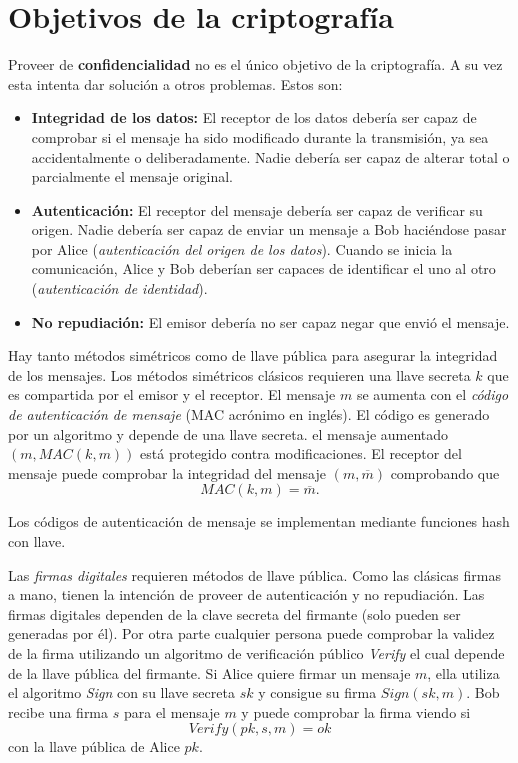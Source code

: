 \documentclass[12pt]{book}
\theoremstyle{definition}
\begin{document}
\section{Objetivos de la criptografía}

Proveer de \textbf{confidencialidad} no es el único objetivo de la criptografía. A su vez esta intenta dar solución a otros problemas. Estos son:

\begin{itemize}
\item \textbf{Integridad de los datos:} El receptor de los datos debería ser capaz de comprobar si el mensaje ha sido modificado durante la transmisión, ya sea accidentalmente o deliberadamente. Nadie debería ser capaz de alterar total o parcialmente el mensaje original.

\item \textbf{Autenticación:} El receptor del mensaje debería ser capaz de verificar su origen. Nadie debería ser capaz de enviar un mensaje a Bob haciéndose pasar por Alice (\textit{autenticación del origen de los datos}). Cuando se inicia la comunicación, Alice y Bob deberían ser capaces de identificar el uno al otro (\textit{autenticación de identidad}).

\item \textbf{No repudiación:} El emisor debería no ser capaz negar que envió el mensaje.
\end{itemize}

Hay tanto métodos simétricos como de llave pública para asegurar la integridad de los mensajes. Los métodos simétricos clásicos requieren una llave secreta $k$ que es compartida por el emisor y el receptor. El mensaje $m$ se aumenta con el \textit{código de autenticación de mensaje} (MAC acrónimo en inglés). El código es generado por un algoritmo y depende de una llave secreta. el mensaje aumentado $(m,MAC(k,m))$ está protegido contra modificaciones. El receptor del mensaje puede comprobar la integridad del mensaje $(m,\overline{m})$ comprobando que
$$MAC(k,m)=\overline{m}.$$

Los códigos de autenticación de mensaje se implementan mediante funciones hash con llave.

Las \textit{firmas digitales} requieren métodos de llave pública. Como las clásicas firmas a mano, tienen la intención de proveer de autenticación y no repudiación. Las firmas digitales dependen de la clave secreta del firmante (solo pueden ser generadas por él). Por otra parte cualquier persona puede comprobar la validez de la firma utilizando un algoritmo de verificación público \textit{Verify} el cual depende de la llave pública del firmante. Si Alice quiere firmar un mensaje $m$, ella utiliza el algoritmo \textit{Sign} con su llave secreta $sk$ y consigue su firma $Sign(sk,m)$. Bob recibe una firma $s$ para el mensaje $m$ y puede comprobar la firma viendo si
$$Verify(pk,s,m)=ok$$
con la llave pública de Alice $pk$.
\end{document}
